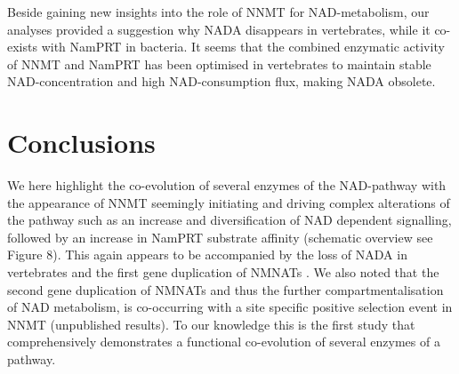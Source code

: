 Beside gaining new insights into the role of NNMT for NAD-metabolism, our analyses  provided a suggestion why NADA disappears in vertebrates, while it co-exists with NamPRT in bacteria. It seems that the combined enzymatic activity of NNMT and NamPRT has been optimised in vertebrates to maintain stable NAD-concentration and high NAD-consumption flux, making NADA obsolete.

\section{Conclusions}

We here highlight the co-evolution of several enzymes of the NAD-pathway with the appearance of NNMT seemingly initiating and driving complex alterations of the pathway such as an increase and diversification of NAD dependent signalling, followed by an increase in NamPRT substrate affinity (schematic overview see Figure 8). This again appears to be accompanied by the loss of NADA in vertebrates and the first gene duplication of NMNATs \cite{Lau2010}. We also noted that the second gene duplication of NMNATs and thus the further compartmentalisation of NAD metabolism, is co-occurring with a site specific positive selection event in NNMT (unpublished results). To our knowledge this is the first study that comprehensively demonstrates a functional co-evolution of several enzymes of a pathway.